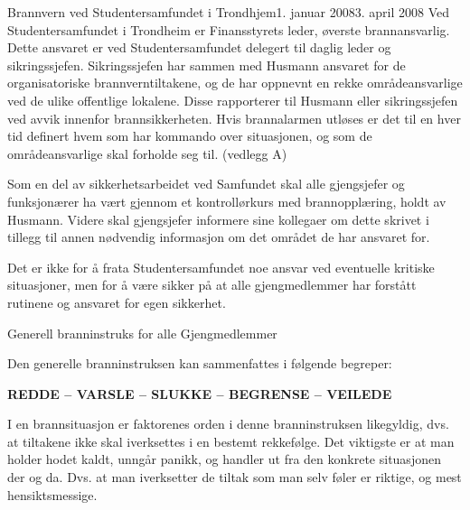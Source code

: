 

\begin{instruks}{Brannvern ved Studentersamfundet i Trondhjem}{1. januar 2008}{3. april 2008}
    Ved Studentersamfundet i Trondheim er Finansstyrets leder, øverste brannansvarlig. Dette ansvaret er ved
    Studentersamfundet delegert til daglig leder og sikringssjefen. Sikringssjefen har sammen med Husmann ansvaret for
    de organisatoriske brannverntiltakene, og de har oppnevnt en rekke områdeansvarlige ved de ulike offentlige lokalene.
    Disse rapporterer til Husmann eller sikringssjefen ved avvik innenfor brannsikkerheten.
    Hvis brannalarmen utløses er det til en hver tid definert hvem som har kommando over situasjonen, og som de
    områdeansvarlige skal forholde seg til. (vedlegg A) 

    Som en del av sikkerhetsarbeidet ved Samfundet skal alle gjengsjefer og funksjonærer ha vært gjennom et
    kontrollørkurs med brannopplæring, holdt av Husmann. Videre skal gjengsjefer informere sine kollegaer om dette skrivet 
    i tillegg til annen nødvendig informasjon om det området de har ansvaret for. 

    Det er ikke for å frata Studentersamfundet noe ansvar ved eventuelle kritiske situasjoner, men for å være sikker på at
    alle gjengmedlemmer har forstått rutinene og ansvaret for egen sikkerhet.

    \begin{instruksledd}{Generell branninstruks for alle Gjengmedlemmer}

        Den generelle branninstruksen kan sammenfattes i følgende begreper:

        \begin{center}
            \textbf{REDDE -- VARSLE -- SLUKKE -- BEGRENSE -- VEILEDE}
        \end{center}

        I en brannsituasjon er faktorenes orden i denne branninstruksen likegyldig, dvs. at
        tiltakene ikke skal iverksettes i en
        bestemt rekkefølge. Det viktigste er at man holder hodet kaldt, unngår panikk, og
        handler ut fra den konkrete
        situasjonen der og da. Dvs. at man iverksetter de tiltak som man selv føler er
        riktige, og mest hensiktsmessige.


\end{instruksledd}
\end{instruks}
